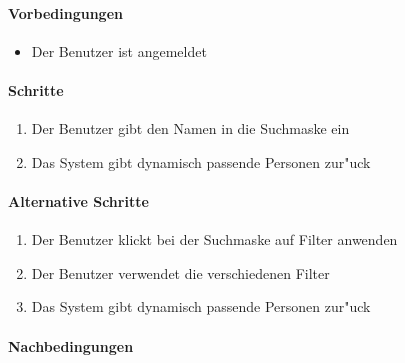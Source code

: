   \paragraph{Vorbedingungen}
  \begin{itemize}
   \item Der Benutzer ist angemeldet
  \end{itemize}

  \paragraph{Schritte}
  \begin{enumerate}
   \item Der Benutzer gibt den Namen in die Suchmaske ein
   \item Das System gibt dynamisch passende Personen zur"uck
  \end{enumerate}

  \paragraph{Alternative Schritte}
  \begin{enumerate}
   \item Der Benutzer klickt bei der Suchmaske auf \dq Filter anwenden\dq
   \item Der Benutzer verwendet die verschiedenen Filter
   \item Das System gibt dynamisch passende Personen zur"uck
  \end{enumerate}

  \paragraph{Nachbedingungen}
